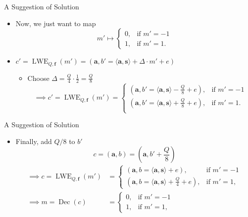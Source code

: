 \documentclass[aspectratio=169]{beamer}
\begin{document}
\begin{frame}{A Suggestion of Solution}
    \begin{itemize}
        \item Now, we just want to map
        \begin{equation*}
            m' \mapsto
            \begin{cases}
              0, & \text{if $m' = -1$} \\
              1, & \text{if $m' = 1$}.
            \end{cases}
        \end{equation*}
    \end{itemize}
    \begin{itemize}
        \item $c' = \operatorname{LWE}_{Q,\mathbf{f}}(m') = (\mathbf{a}, b' = \langle \mathbf{a}, \mathbf{s} \rangle + \Delta \cdot m' + e)$
        \begin{itemize}
            \item Choose $\Delta = \frac{Q}{4} \cdot \frac{1}{2} = \frac{Q}{8}$
            \begin{equation*}
                \implies c' = \operatorname{LWE}_{Q,\mathbf{f}}(m') =
                \begin{cases}
                  (\mathbf{a}, b' = \langle \mathbf{a}, \mathbf{s} \rangle - \frac{Q}{8} + e), & \text{if $m' = -1$} \\
                  (\mathbf{a}, b' = \langle \mathbf{a}, \mathbf{s} \rangle + \frac{Q}{8} + e), & \text{if $m' = 1$}. \\
                \end{cases}
            \end{equation*}
        \end{itemize}
    \end{itemize}
\end{frame}

\begin{frame}{A Suggestion of Solution}
    \begin{itemize}
        \item Finally, add $Q/8$ to $b'$
        $$c = (\mathbf{a},b) = \left(\mathbf{a},b' + \frac{Q}{8}\right)$$
        \begin{align*}
            \implies c = \operatorname{LWE}_{Q,\mathbf{f}}(m') &=
            \begin{cases}
              (\mathbf{a}, b = \langle \mathbf{a}, \mathbf{s} \rangle + e), & \text{if $m' = -1$} \\
              (\mathbf{a}, b = \langle \mathbf{a}, \mathbf{s} \rangle + \frac{Q}{4} + e), & \text{if $m' = 1$},
            \end{cases} \\
            \implies m = \operatorname{Dec}(c) &=
            \begin{cases}
              0, & \text{if $m' = -1$} \\
              1, & \text{if $m' = 1$},
            \end{cases}
        \end{align*}
    \end{itemize}
\end{frame}
\end{document}
